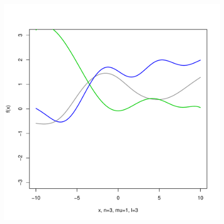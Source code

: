 \documentclass[12pt,letterpaper]{article}
\begin{document}
\begin{figure}
\begin{center}
\includegraphics[scale=0.2]{hw321/n3-m1-l3.pdf}
\end{center}
\end{figure}
\end{document}
